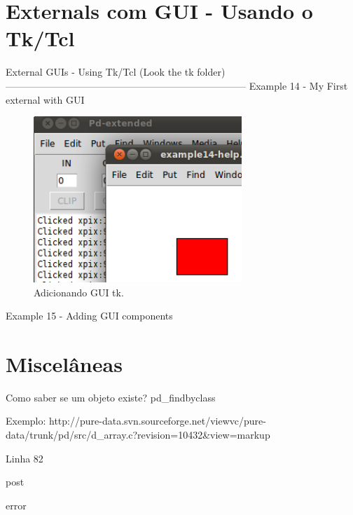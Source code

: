 \documentclass[10pt,a4paper]{report}
\begin{document}
\chapter{Externals com GUI - Usando o Tk/Tcl}
External GUIs - Using Tk/Tcl (Look the tk folder)
--------------------------------------------------------------------------
Example 14 - My First external with GUI
\begin{figure}[h!]
	\centering
	\includegraphics[width=0.7\textwidth]{example14}
	\caption{Adicionando GUI tk.}
\end{figure}

Example 15 - Adding GUI components


\chapter{Miscelâneas}
Como saber se um objeto existe?
pd\_findbyclass

Exemplo: http://pure-data.svn.sourceforge.net/viewvc/pure-data/trunk/pd/src/d\_array.c?revision=10432\&view=markup 

Linha 82


post

error
\end{document}
